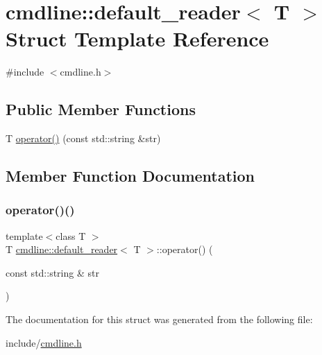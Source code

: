 \hypertarget{structcmdline_1_1default__reader}{}\section{cmdline\+::default\+\_\+reader$<$ T $>$ Struct Template Reference}
\label{structcmdline_1_1default__reader}


{\ttfamily \#include $<$cmdline.\+h$>$}

\subsection*{Public Member Functions}
\begin{DoxyCompactItemize}
\item 
T \mbox{\hyperlink{structcmdline_1_1default__reader_a71f97c64added8d907fb95c0e5fe1f6f}{operator()}} (const std\+::string \&str)
\end{DoxyCompactItemize}


\subsection{Member Function Documentation}
\mbox{\label{structcmdline_1_1default__reader_a71f97c64added8d907fb95c0e5fe1f6f}} 
\subsubsection{\texorpdfstring{operator()()}{operator()()}}
{\footnotesize\ttfamily template$<$class T $>$ \\
T \mbox{\hyperlink{structcmdline_1_1default__reader}{cmdline\+::default\+\_\+reader}}$<$ T $>$\+::operator() (\begin{DoxyParamCaption}\item[{const std\+::string \&}]{str }\end{DoxyParamCaption})\hspace{0.3cm}{\ttfamily [inline]}}



The documentation for this struct was generated from the following file\+:\begin{DoxyCompactItemize}
\item 
include/\mbox{\hyperlink{cmdline_8h}{cmdline.\+h}}\end{DoxyCompactItemize}
